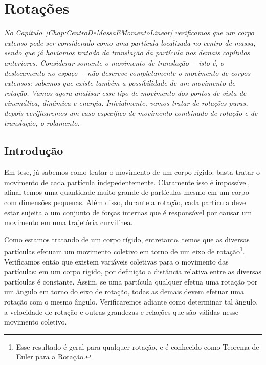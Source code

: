 \chapter{Rotações}\label{Chap:Rotacoes}



\begin{fullwidth}
{\it
No Capítulo~\ref{Chap:CentroDeMassaEMomentoLinear} verificamos que um corpo extenso pode ser considerado como uma partícula localizada no centro de massa, sendo que já haviamos tratado da translação da partícula nos demais capítulos anteriores. Considerar somente o movimento de translação --~isto é, o deslocamento no espaço~-- não descreve completamente o movimento de corpos extensos: sabemos que existe também a possibilidade de um movimento de rotação. Vamos agora analisar esse tipo de movimento dos pontos de vista de cinemática, dinâmica e energia. Inicialmente, vamos tratar de rotações puras, depois verificaremos um caso específico de movimento combinado de rotação e de translação, o rolamento.
}
\end{fullwidth}

\section{Introdução}

Em tese, já sabemos como tratar o movimento de um corpo rígido: basta tratar o movimento de cada partícula indepedentemente. Claramente isso é impossível, afinal temos uma quantidade muito grande de partículas mesmo em um corpo com dimensões pequenas. Além disso, durante a rotação, cada partícula deve estar sujeita a um conjunto de forças internas que é responsável por causar um movimento em uma trajetória curvilínea.

Como estamos tratando de um corpo rígido, entretanto, temos que as diversas partículas efetuam um movimento coletivo em torno de um eixo de rotação\footnote{Esse resultado é geral para qualquer rotação, e é conhecido como Teorema de Euler para a Rotação.}. Verificamos então que existem variáveis coletivas para o movimento das partículas: em um corpo rígido, por definição a distância relativa entre as diversas partículas é constante. Assim, se uma partícula qualquer efetua uma rotação por um ângulo em torno do eixo de rotação, todas as demais devem efetuar uma rotação com o mesmo ângulo. Verificaremos adiante como determinar tal ângulo, a velocidade de rotação e outras grandezas e relações que são válidas nesse movimento coletivo.

